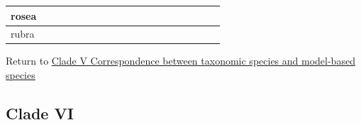 \documentclass[
  11pt,
]{article}
\begin{document}
\begin{table}[H]
\begin{tabular}[t]{>{}l|>{}l|>{}l|>{}l|>{}l|>{}l|>{}l|>{}l|>{}l||>{}l|>{}l|>{}l|>{}l|>{}l|>{}l|>{}l|>{}l|>{}l|>{}l|}
\midrule
rosea & \cellcolor[HTML]{FFFFFF}{\textcolor[HTML]{FFFFFF}{0}} & \cellcolor[HTML]{BBBBBB}{\textcolor[HTML]{BBBBBB}{1}} & \cellcolor[HTML]{BBBBBB}{\textcolor[HTML]{BBBBBB}{1}} & \cellcolor[HTML]{BBBBBB}{\textcolor[HTML]{BBBBBB}{1}} & \cellcolor[HTML]{FFFFFF}{\textcolor[HTML]{FFFFFF}{0}} & \cellcolor[HTML]{FFFFFF}{\textcolor[HTML]{FFFFFF}{0}} & \cellcolor[HTML]{BBBBBB}{\textcolor[HTML]{BBBBBB}{1}} & \cellcolor[HTML]{FFFFFF}{\textcolor[HTML]{FFFFFF}{0}} & \cellcolor[HTML]{FFFFFF}{\textcolor[HTML]{FFFFFF}{0}} & \cellcolor[HTML]{FFFFFF}{\textcolor[HTML]{FFFFFF}{0}} & \cellcolor[HTML]{FFFFFF}{\textcolor[HTML]{FFFFFF}{0}} & \cellcolor[HTML]{BBBBBB}{\textcolor[HTML]{BBBBBB}{1}} & \cellcolor[HTML]{FFFFFF}{\textcolor[HTML]{FFFFFF}{0}} & \cellcolor[HTML]{BBBBBB}{\textcolor[HTML]{BBBBBB}{1}} & \cellcolor[HTML]{FFFFFF}{\textcolor[HTML]{FFFFFF}{0}} & \cellcolor[HTML]{FFFFFF}{\textcolor[HTML]{FFFFFF}{0}} & \cellcolor[HTML]{BBBBBB}{\textcolor[HTML]{BBBBBB}{1}} & \cellcolor[HTML]{FFFFFF}{\textcolor[HTML]{FFFFFF}{0}}\\
\midrule
rubra & \cellcolor[HTML]{FFFFFF}{\textcolor[HTML]{FFFFFF}{0}} & \cellcolor[HTML]{BBBBBB}{\textcolor[HTML]{BBBBBB}{1}} & \cellcolor[HTML]{BBBBBB}{\textcolor[HTML]{BBBBBB}{1}} & \cellcolor[HTML]{BBBBBB}{\textcolor[HTML]{BBBBBB}{1}} & \cellcolor[HTML]{BBBBBB}{\textcolor[HTML]{BBBBBB}{1}} & \cellcolor[HTML]{FFFFFF}{\textcolor[HTML]{FFFFFF}{0}} & \cellcolor[HTML]{BBBBBB}{\textcolor[HTML]{BBBBBB}{1}} & \cellcolor[HTML]{FFFFFF}{\textcolor[HTML]{FFFFFF}{0}} & \cellcolor[HTML]{FFFFFF}{\textcolor[HTML]{FFFFFF}{0}} & \cellcolor[HTML]{FFFFFF}{\textcolor[HTML]{FFFFFF}{0}} & \cellcolor[HTML]{FFFFFF}{\textcolor[HTML]{FFFFFF}{0}} & \cellcolor[HTML]{FFFFFF}{\textcolor[HTML]{FFFFFF}{0}} & \cellcolor[HTML]{FFFFFF}{\textcolor[HTML]{FFFFFF}{0}} & \cellcolor[HTML]{FFFFFF}{\textcolor[HTML]{FFFFFF}{0}} & \cellcolor[HTML]{FFFFFF}{\textcolor[HTML]{FFFFFF}{0}} & \cellcolor[HTML]{FFFFFF}{\textcolor[HTML]{FFFFFF}{0}} & \cellcolor[HTML]{BBBBBB}{\textcolor[HTML]{BBBBBB}{1}} & \cellcolor[HTML]{BBBBBB}{\textcolor[HTML]{BBBBBB}{1}}\\
\bottomrule
\end{tabular}
\end{table}

Return to \protect\hyperlink{correspondence-between-taxonomic-species-and-model-based-species-4}{Clade V Correspondence between taxonomic species and model-based species}
\pagebreak

\hypertarget{clade-vi-1}{%
\subsection{Clade VI}\label{clade-vi-1}}
\end{document}
